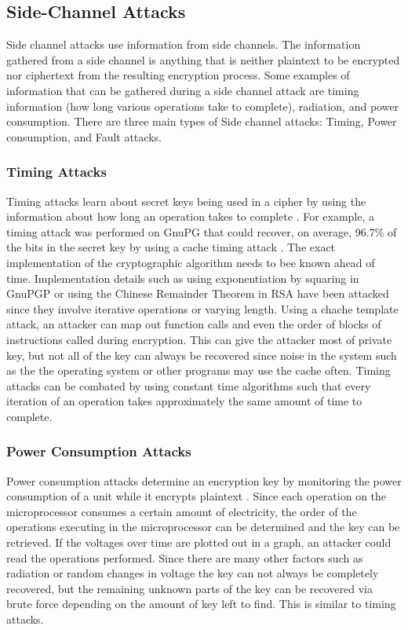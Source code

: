 \documentclass[12pt]{article}
\begin{document}
\subsection{Side-Channel Attacks}
Side channel attacks use information from side channels. The information gathered from a side channel is anything that is neither plaintext to be encrypted nor ciphertext from the resulting encryption process. Some examples of information that can be gathered during a side channel attack are timing information (how long various operations take to complete), radiation, and power consumption. There are three main types of Side channel attacks: Timing, Power consumption, and Fault attacks\cite[pg. 2-3]{sidechannel}.

\subsubsection{Timing Attacks}
Timing attacks learn about secret keys being used in a cipher by using the information about how long an operation takes to complete \cite[pg 3]{sidechannel}. For example, a timing attack was performed on GnuPG that could recover, on average, 96.7\% of the bits in the secret key by using a cache timing attack \cite[pg. 719]{flushreload}. The exact implementation of the cryptographic algorithm needs to bee known ahead of time. Implementation details such as using exponentiation by squaring in GnuPGP or using the Chinese Remainder Theorem in RSA have been attacked since they involve iterative operations or varying length. Using a chache template attack, an attacker can map out function calls and even the order of blocks of instructions called during encryption. This can give the attacker most of private key, but not all of the key can always be recovered since noise in the system such as the the operating system or other programs may use the cache often. Timing attacks can be combated by using constant time algorithms such that every iteration of an operation takes approximately the same amount of time to complete.

\subsubsection{Power Consumption Attacks}
Power consumption attacks determine an encryption key by monitoring the power consumption of a unit while it encrypts plaintext \cite[pg. 6]{sidechannel}. Since each operation on the microprocessor consumes a certain amount of electricity, the order of the operations executing in the microprocessor can be determined and the key can be retrieved. If the voltages over time are plotted out in a graph, an attacker could read the operations performed. Since there are many other factors such as radiation or random changes in voltage the key can not always be completely recovered, but the remaining unknown parts of the key can be recovered via brute force depending on the amount of key left to find. This is similar to timing attacks.
\end{document}
